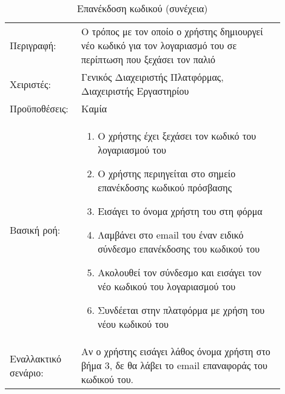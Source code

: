 %
%
\begin{longtable}{|p{0.2\linewidth}|p{0.7\linewidth}|} 
	\caption{Επανέκδοση κωδικού} \label{tab:use-case-forgot-password} \\
	\hline
	\endfirsthead
	\caption{Επανέκδοση κωδικού (συνέχεια)} \\ 
	\endhead \endfoot 
	Περιγραφή: & Ο τρόπος με τον οποίο ο χρήστης δημιουργεί νέο κωδικό για τον λογαριασμό του σε περίπτωση που ξεχάσει τον παλιό \\ \hline
	Χειριστές: & Γενικός Διαχειριστής Πλατφόρμας, Διαχειριστής Εργαστηρίου \\ \hline
	Προϋποθέσεις: & Καμία \\ \hline
	Βασική ροή: & 
	\begin{enumerate}
		\vspace{-1cm}
		\addtolength{\itemindent}{-0.4cm}
		\item Ο χρήστης έχει ξεχάσει τον κωδικό του λογαριασμού του
		\item Ο χρήστης περιηγείται στο σημείο επανέκδοσης κωδικού πρόσβασης
		\item Εισάγει το όνομα χρήστη του στη φόρμα
		\item Λαμβάνει στο email του έναν ειδικό σύνδεσμο επανέκδοσης του κωδικού του
		\item Ακολουθεί τον σύνδεσμο και εισάγει τον νέο κωδικού του λογαριασμού του
		\item Συνδέεται στην πλατφόρμα με χρήση του νέου κωδικού του
		\vspace{-0.7cm}
	\end{enumerate} \\ \hline
	Εναλλακτικό σενάριο: & Αν ο χρήστης εισάγει λάθος όνομα χρήστη στο βήμα 3, δε θα λάβει το email επαναφοράς του κωδικού του. \\ \hline
\end{longtable}

